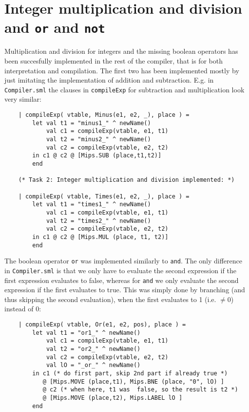 \documentclass{article}
\begin{document}
\section{Integer multiplication and division and \texttt{or} and \texttt{not}}
Multiplication and division for integers and the missing boolean operators has been succesfully implemented in the rest of the compiler, that is for both interpretation and compilation. The first two has been implemented mostly by just imitating the implementation of addition and subtraction. E.g. in \texttt{Compiler.sml} the clauses in \texttt{compileExp} for subtraction and multiplication look very similar:
\begin{lstlisting}
    | compileExp( vtable, Minus(e1, e2, _), place ) =
        let val t1 = "minus1_" ^ newName()
            val c1 = compileExp(vtable, e1, t1)
            val t2 = "minus2_" ^ newName()
            val c2 = compileExp(vtable, e2, t2)
        in c1 @ c2 @ [Mips.SUB (place,t1,t2)]
        end

    (* Task 2: Integer multiplication and division implemented: *)

    | compileExp( vtable, Times(e1, e2, _), place ) =
        let val t1 = "times1_" ^ newName()
            val c1 = compileExp(vtable, e1, t1)
            val t2 = "times2_" ^ newName()
            val c2 = compileExp(vtable, e2, t2)
        in c1 @ c2 @ [Mips.MUL (place, t1, t2)]
        end
\end{lstlisting}
The boolean operator \texttt{or} was implemented similarly to \texttt{and}. The only difference in \texttt{Compiler.sml} is that we only have to evaluate the second expression if the first expression
evaluates to false, whereas for \texttt{and} we only evaluate the second expression if the first
evaluates to true. This was simply done by branching (and thus skipping the second evaluation),
when the first evaluates to 1 (i.e. $\neq 0$) instead of 0:
\begin{lstlisting}
    | compileExp( vtable, Or(e1, e2, pos), place ) =
        let val t1 = "or1_" ^ newName()
            val c1 = compileExp(vtable, e1, t1)
            val t2 = "or2_" ^ newName()
            val c2 = compileExp(vtable, e2, t2)
            val lO = "_or_" ^ newName()
        in c1 (* do first part, skip 2nd part if already true *)
           @ [Mips.MOVE (place,t1), Mips.BNE (place, "0", lO) ]
           @ c2 (* when here, t1 was  false, so the result is t2 *)
           @ [Mips.MOVE (place,t2), Mips.LABEL lO ]
        end
\end{lstlisting}
\end{document}
